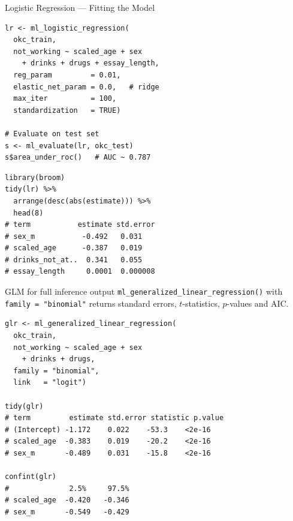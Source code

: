 \documentclass[11pt, aspectratio=169]{beamer}
\newcommand{\Rfun}[1]{\texttt{\textcolor{codekw}{#1}}}
\begin{document}
\begin{frame}{Logistic Regression --- Fitting the Model}
	\begin{lstlisting}[title={Book example (therinspark.com §4.4.1)}]
lr <- ml_logistic_regression(
  okc_train,
  not_working ~ scaled_age + sex
    + drinks + drugs + essay_length,
  reg_param         = 0.01,
  elastic_net_param = 0.0,   # ridge
  max_iter          = 100,
  standardization   = TRUE)

# Evaluate on test set
s <- ml_evaluate(lr, okc_test)
s$area_under_roc()   # AUC ~ 0.787
			\end{lstlisting}
			\begin{lstlisting}[title={Coefficient table via broom}]
library(broom)
tidy(lr) %>%
  arrange(desc(abs(estimate))) %>%
  head(8)
# term           estimate std.error
# sex_m           -0.492   0.031
# scaled_age      -0.387   0.019
# drinks_not_at..  0.341   0.055
# essay_length     0.0001  0.000008
			\end{lstlisting}
		\begin{block}{GLM for full inference output}
				\Rfun{ml\_generalized\_linear\_regression()} with
				\texttt{family = "binomial"} returns standard errors,
				$t$-statistics, $p$-values and AIC.
			\end{block}
			\begin{lstlisting}[title={Binomial GLM (therinspark.com)}]
glr <- ml_generalized_linear_regression(
  okc_train,
  not_working ~ scaled_age + sex
    + drinks + drugs,
  family = "binomial",
  link   = "logit")

tidy(glr)
# term         estimate std.error statistic p.value
# (Intercept) -1.172    0.022    -53.3    <2e-16
# scaled_age  -0.383    0.019    -20.2    <2e-16
# sex_m       -0.489    0.031    -15.8    <2e-16

confint(glr)
#              2.5%     97.5%
# scaled_age  -0.420   -0.346
# sex_m       -0.549   -0.429
			\end{lstlisting}
		\end{frame}
\end{document}
